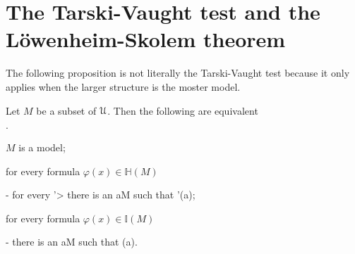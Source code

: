 \documentclass[10pt,oneside]{amsproc}
\newcommand{\mylabel}[1]{{#1}\hfill}
\renewenvironment{itemize}
  {\begin{list}{$\cdot$}{%
  \setlength{\parskip}{0mm}
  \setlength{\topsep}{.4\baselineskip}
  \setlength{\rightmargin}{0mm}
  \setlength{\listparindent}{0mm}
  \setlength{\itemindent}{0mm}
  \setlength{\labelwidth}{3ex}
  \setlength{\itemsep}{.2\baselineskip}
  \setlength{\parsep}{.2\baselineskip}
  \setlength{\partopsep}{0mm}
  \setlength{\labelsep}{1ex}
  \setlength{\leftmargin}{\labelwidth+\labelsep}
  \let\makelabel\mylabel}}{%
\end{list}}
\begin{document}
\section{The Tarski-Vaught test and the L\"owenheim-Skolem theorem}

The following proposition is not literally the Tarski-Vaught test because it only applies when the larger structure is the moster model.

\begin{proposition}\label{prop_Tarski_Vaught}
  Let $M$ be a subset of ${\EuScript U}$.
  Then the following are equivalent
  \begin{itemize}
    \item[1.] $M$ is a model;
    \item[2.] for every formula $\varphi(x)\in\mathds{H}(M)$
    
    \noindent\kern-\leftmargin
    {\textrm{ for every }\varphi'>\varphi\textrm{ there is an }a\in M\textrm{ such that }\varphi'(a);}
    \item[3.] for every formula $\varphi(x)\in\mathds{I}(M)$
    
    \noindent\kern-\leftmargin
    {\textrm{ there is an }a\in M\textrm{ such that }\neg\varphi(a).}
    
  \end{itemize}
\end{proposition}
\end{document}
